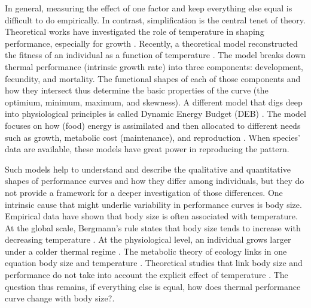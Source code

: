 In general, measuring the effect of one factor and keep everything else equal  is difficult to do empirically.
In contrast, simplification is the central tenet of theory. %
Theoretical works have investigated the role of temperature in shaping performance, especially for growth \citep{VandH1996, Kozlowski2004}.
Recently, a theoretical model reconstructed the fitness of an individual as a function of temperature \citep{Amarasekare2012}.
The model  breaks down thermal performance (intrinsic growth rate)  into three components: development, fecundity, and mortality.
The functional shapes of each of those components and how they intersect thus determine the basic properties of the curve (the optimium, minimum, maximum, and skewness).
A different model that digs deep into physiological principles is called Dynamic Energy Budget (DEB) \citep{Kooijman2009}. %
The model focuses on how (food) energy is assimilated and then allocated to different needs such as growth, metabolic cost (maintenance), and reproduction \citep{Kooijman2009}.
When species'  data are available, these models have great power in reproducing the pattern.  %

Such models help to understand and describe the qualitative and quantitative shapes of performance curves and how they differ among individuals, but they do not provide a framework for a deeper investigation of those differences.
One intrinsic cause that might underlie variability in performance curves is body size.
Empirical data have shown that body size is often associated with temperature.  
At the global scale, Bergmann's rule states that body size tends to increase with decreasing temperature \citep{Bergmann1847}.
At the physiological level, an individual grows larger under a colder thermal regime \citep{Van1996}.
The metabolic theory of ecology links in one equation body size and temperature \citep{Gillooly2001}.
Theoretical studies that link body size and performance do not take into account the explicit effect of temperature \citep[e.g.,][]{Yodzis1992, Brown1993}. %
The question thus remains, if everything else is equal, how does thermal performance curve change with body size?. %

